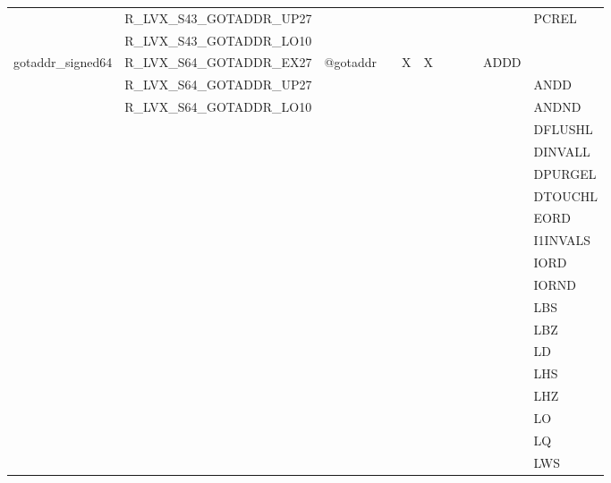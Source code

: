 {\begin{tabular}{|l|l|l|l|l|l|l|l|l|l|l|}
 & \textsf{R\_LVX\_S43\_GOTADDR\_UP27} & & & & & & & & & \textsf{PCREL} \\
 & \textsf{R\_LVX\_S43\_GOTADDR\_LO10} & & & & & & & & & \\
\hline
\textsf{gotaddr\_signed64} & \textsf{R\_LVX\_S64\_GOTADDR\_EX27} & \textsf{@gotaddr} & \textsf{} & \textsf{X} & \textsf{X} & \textsf{} & \textsf{} & \textsf{} & \textsf{ADDD} \\
 & \textsf{R\_LVX\_S64\_GOTADDR\_UP27} & & & & & & & & & \textsf{ANDD} \\
 & \textsf{R\_LVX\_S64\_GOTADDR\_LO10} & & & & & & & & & \textsf{ANDND} \\
 & & & & & & & & & & \textsf{DFLUSHL} \\
 & & & & & & & & & & \textsf{DINVALL} \\
 & & & & & & & & & & \textsf{DPURGEL} \\
 & & & & & & & & & & \textsf{DTOUCHL} \\
 & & & & & & & & & & \textsf{EORD} \\
 & & & & & & & & & & \textsf{I1INVALS} \\
 & & & & & & & & & & \textsf{IORD} \\
 & & & & & & & & & & \textsf{IORND} \\
 & & & & & & & & & & \textsf{LBS} \\
 & & & & & & & & & & \textsf{LBZ} \\
 & & & & & & & & & & \textsf{LD} \\
 & & & & & & & & & & \textsf{LHS} \\
 & & & & & & & & & & \textsf{LHZ} \\
 & & & & & & & & & & \textsf{LO} \\
 & & & & & & & & & & \textsf{LQ} \\
 & & & & & & & & & & \textsf{LWS} \\
\hline\end{tabular}
}
\smallskip

